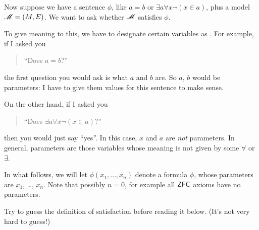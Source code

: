 Now suppose we have a sentence $\phi$, like $a = b$ or $\exists a \forall x \neg (x \in a)$,
plus a model $\mathscr M = (M,E)$.
We want to ask whether $\mathscr M$ satisfies $\phi$.

To give meaning to this, we have to designate certain variables as .
For example, if I asked you
\begin{quote}
	``Does $a=b$?''
\end{quote}
the first question you would ask is what $a$ and $b$ are.
So $a$, $b$ would be parameters: I have to give them values for this sentence to make sense.

On the other hand, if I asked you
\begin{quote}
	``Does $\exists a \forall x \neg (x \in a)$?''
\end{quote}
then you would just say ``yes''.
In this case, $x$ and $a$ are \emph{not} parameters.
In general, parameters are those variables whose meaning is not given by some $\forall$ or $\exists$.

In what follows, we will let $\phi(x_1, \dots, x_n)$ denote a formula $\phi$,
whose parameters are $x_1$, \dots, $x_n$.
Note that possibly $n=0$, for example all $\mathsf{ZFC}$ axioms have no parameters.

\begin{ques}
	Try to guess the definition of satisfaction before reading it below.
	(It's not very hard to guess!)
\end{ques}

